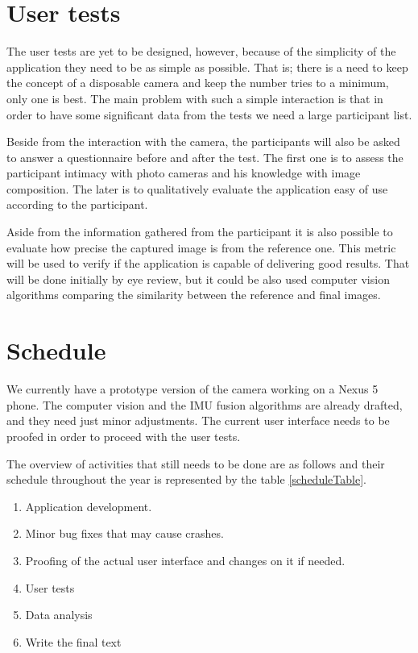 \documentclass[12pt]{article}
\begin{document}
\section{User tests}
The user tests are yet to be designed, however, because of the simplicity of the application they need to be as simple as possible. That is; there is a need to keep the concept of a disposable camera and keep the number tries to a minimum, only one is best. The main problem with such a simple interaction is that in order to have some significant data from the tests we need a large participant list.

Beside from the interaction with the camera, the participants will also be asked to answer a questionnaire before and after the test. The first one is to assess the participant intimacy with photo cameras and his knowledge with image composition. The later is to qualitatively evaluate the application easy of use according to the participant. 

Aside from the information gathered from the participant it is also possible to evaluate how precise the captured image is from the reference one. This metric will be used to verify if the application is capable of delivering good results. That will be done initially by eye review, but it could be also used computer vision algorithms comparing the similarity between the reference and final images.

\section{Schedule}
We currently have a prototype version of the camera working on a Nexus 5 phone. The computer vision and the IMU fusion algorithms are already drafted, and they need just minor adjustments. The current user interface needs to be proofed in order to proceed with the user tests.

The overview of activities that still needs to be done are as follows and their schedule throughout the year is represented by the table \ref{scheduleTable}.
\begin{enumerate}
  \item Application development.
    \item Minor bug fixes that may cause crashes.
    \item Proofing of the actual user interface and changes on it if needed.
    \item User tests
    \item Data analysis
    \item Write the final text
\end{enumerate}
\end{document}
